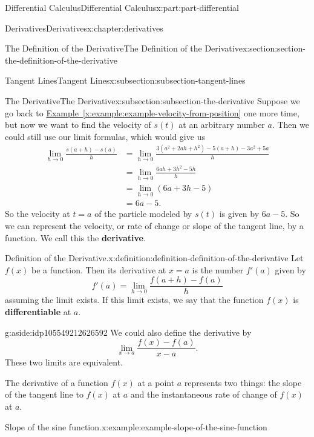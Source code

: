 \documentclass[twoside,10pt,]{book}
\newcommand{\xreffont}{\relax}
\newcommand{\terminology}[1]{\textbf{#1}}
\numberwithin{equation}{part}
\begin{document}
\begin{partptx}{Differential Calculus}{}{Differential Calculus}{}{}{x:part:part-differential}
\begin{chapterptx}{Derivatives}{}{Derivatives}{}{}{x:chapter:derivatives}
\begin{sectionptx}{The Definition of the Derivative}{}{The Definition of the Derivative}{}{}{x:section:section-the-definition-of-the-derivative}
\begin{subsectionptx}{Tangent Lines}{}{Tangent Lines}{}{}{x:subsection:subsection-tangent-lines}
\end{subsectionptx}
%
%
\typeout{************************************************}
\typeout{************************************************}
%
\begin{subsectionptx}{The Derivative}{}{The Derivative}{}{}{x:subsection:subsection-the-derivative}
Suppose we go back to \hyperref[x:example:example-velocity-from-position]{Example~{\xreffont\ref{x:example:example-velocity-from-position}}} one more time, but now we want to find the velocity of \(s(t)\) at an arbitrary number \(a\). Then we could still use our limit formulas, which would give us%
%
\begin{align*}
\lim_{h\to0}\frac{s(a+h)-s(a)}{h} & = \lim_{h\to0}\frac{3(a^{2}+2ah+h^{2})-5(a+h) - 3a^{2} + 5a}{h} \\
& = \lim_{h\to0}\frac{6ah+3h^{2} - 5h}{h} \\
& = \lim_{h\to0}(6a+3h-5) \\
& = 6a-5. 
\end{align*}
So the velocity at \(t=a\) of the particle modeled by \(s(t)\) is given by \(6a-5\). So we can represent the velocity, or rate of change or slope of the tangent line, by a function. We call this the \terminology{derivative}.%
\begin{definition}{Definition of the Derivative.}{x:definition:definition-definition-of-the-derivative}%
%
%
Let \(f(x)\) be a function. Then its derivative at \(x=a\) is the number \(f'(a)\) given by%
\begin{equation*}
f'(a) = \lim_{h\to0}\frac{f(a+h)-f(a)}{h}
\end{equation*}
assuming the limit exists. If this limit exists, we say that the function \(f(x)\) is \terminology{differentiable} at \(a\).%
\end{definition}
\begin{aside}{}{g:aside:idp105549212626592}%
We could also define the derivative by%
\begin{equation*}
\lim_{x\to a}\frac{f(x)-f(a)}{x-a}.
\end{equation*}
These two limits are equivalent.%
\end{aside}
The derivative of a function \(f(x)\) at a point \(a\) represents two things: the slope of the tangent line to \(f(x)\) at \(a\) and the instantaneous rate of change of \(f(x)\) at \(a\).%
\begin{example}{Slope of the sine function.}{x:example:example-slope-of-the-sine-function}%

\end{example}
\end{subsectionptx}
\end{sectionptx}
\end{chapterptx}
\end{partptx}
\end{document}
